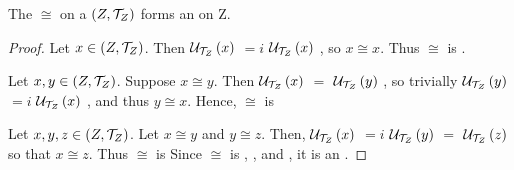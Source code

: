 
\begin{prop}[\RelationOfEqualNeighborhoodFilters]
    \label{prop:EqualNeighborhoodFiltersEquivalenceRelation}
    
    The
	\RelationOfEqualNeighborhoodFilters
	$\cong$ on a \TopologicalSpaceRef $(Z,\mathcal{T}_Z)$ forms an 
	\EquivalenceRelation	
	on Z. 
    \begin{proof}
        
        Let $x \in (Z,\mathcal{T}_Z)$. 
        Then $\mathcal{U}_{\mathcal{T}_{Z}}\left( x\right)$
        $=i$
        $\mathcal{U}_{\mathcal{T}_{Z}}\left( x\right)$
        , so $x \cong x$.
        Thus $\cong$ is 
		\ReflexiveRelation. 
        
        Let $x,y \in (Z,\mathcal{T}_Z)$. 
        Suppose $x \cong y$. 
        Then  $\mathcal{U}_{\mathcal{T}_{Z}}\left( x\right)$
        $=$
        $\mathcal{U}_{\mathcal{T}_{Z}}\left( y\right)$
        , so trivially  $\mathcal{U}_{\mathcal{T}_{Z}}\left( y\right)$
        $=i$
        $\mathcal{U}_{\mathcal{T}_{Z}}\left( x\right)$
        , and thus $y \cong x$.
        Hence, $\cong$ is 
		\SymmetricRelation
        
        Let $x,y,z \in (Z,\mathcal{T}_Z)$.
        Let $x \cong y$ and $y \cong z$. 
        Then, 
         $\mathcal{U}_{\mathcal{T}_{Z}}\left( x\right)$
         $=i$
         $\mathcal{U}_{\mathcal{T}_{Z}}\left( y\right)$
         $=$
         $\mathcal{U}_{\mathcal{T}_{Z}}\left( z\right)$
         so that $x \cong z$.
         Thus $\cong$ is \TransitiveRelation
         Since $\cong$ is 
		 \ReflexiveRelation
		, \SymmetricRelation
		, and \TransitiveRelation, it is an 
		\EquivalenceRelation. 
        
    \end{proof}
\end{prop}
